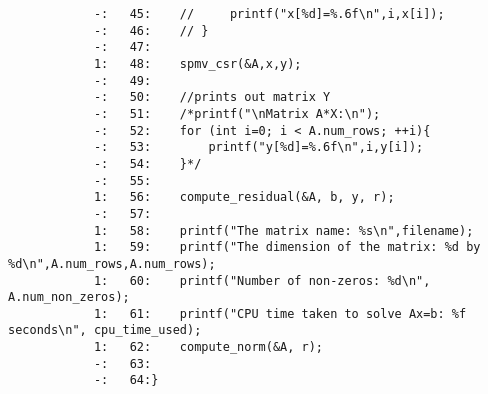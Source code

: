 \documentclass[12pt]{article}
\begin{document}
\begin{mdframed}[style=myboxstyleTerminal1]
\begin{verbatim}
			-:   45:    //     printf("x[%d]=%.6f\n",i,x[i]);
			-:   46:    // }
			-:   47: 
			1:   48:    spmv_csr(&A,x,y);
			-:   49:
			-:   50:    //prints out matrix Y
			-:   51:    /*printf("\nMatrix A*X:\n");
			-:   52:    for (int i=0; i < A.num_rows; ++i){
			-:   53:        printf("y[%d]=%.6f\n",i,y[i]);
			-:   54:    }*/
			-:   55:    
			1:   56:    compute_residual(&A, b, y, r);
			-:   57:        
			1:   58:    printf("The matrix name: %s\n",filename);
			1:   59:    printf("The dimension of the matrix: %d by %d\n",A.num_rows,A.num_rows);
			1:   60:    printf("Number of non-zeros: %d\n", A.num_non_zeros);
			1:   61:    printf("CPU time taken to solve Ax=b: %f seconds\n", cpu_time_used);
			1:   62:    compute_norm(&A, r);
			-:   63:    
			-:   64:}	
		\end{verbatim}
	\end{mdframed}
\end{document}
